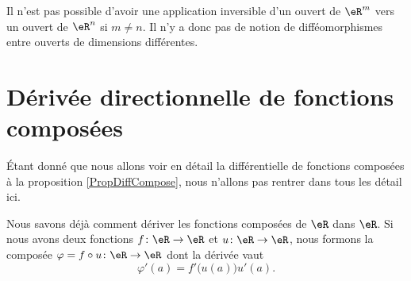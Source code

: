 \begin{remark}
	Il n'est pas possible d'avoir une application inversible d'un ouvert de $\eR^m$ vers un ouvert de $\eR^n$ si $m\neq n$. Il n'y a donc pas de notion de difféomorphismes entre ouverts de dimensions différentes.
\end{remark}
 
\section{Dérivée directionnelle de fonctions composées}		\label{SecDerDirFnComp}

Étant donné que nous allons voir en détail la différentielle de fonctions composées à la proposition \ref{PropDiffCompose}, nous n'allons pas rentrer dans tous les détail ici.

Nous savons déjà comment dériver les fonctions composées de $\eR$ dans $\eR$. Si nous avons deux fonctions $f\colon \eR\to \eR$ et $u\colon \eR\to \eR$, nous formons la composée $\varphi=f\circ u\colon \eR\to \eR$ dont la dérivée vaut
\begin{equation}
	\varphi'(a)=f'\big( u(a) \big)u'(a).
\end{equation}


